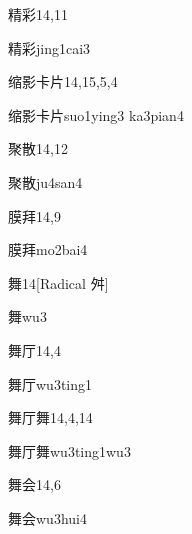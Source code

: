 \begin{entry}{精彩}{14,11}
  \begin{phonetics}{精彩}{jing1cai3}
  \end{phonetics}
\end{entry}

\begin{entry}{缩影卡片}{14,15,5,4}
  \begin{phonetics}{缩影卡片}{suo1ying3 ka3pian4}
  \end{phonetics}
\end{entry}

\begin{entry}{聚散}{14,12}
  \begin{phonetics}{聚散}{ju4san4}
  \end{phonetics}
\end{entry}

\begin{entry}{膜拜}{14,9}
  \begin{phonetics}{膜拜}{mo2bai4}
  \end{phonetics}
\end{entry}

\begin{entry}{舞}{14}[Radical 舛]
  \begin{phonetics}{舞}{wu3}
  \end{phonetics}
\end{entry}

\begin{entry}{舞厅}{14,4}
  \begin{phonetics}{舞厅}{wu3ting1}
  \end{phonetics}
\end{entry}

\begin{entry}{舞厅舞}{14,4,14}
  \begin{phonetics}{舞厅舞}{wu3ting1wu3}
  \end{phonetics}
\end{entry}

\begin{entry}{舞会}{14,6}
  \begin{phonetics}{舞会}{wu3hui4}
  \end{phonetics}
\end{entry}

